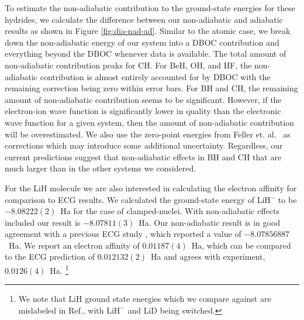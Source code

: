 \documentclass[pra,superscriptaddress,groupedaddress,twocolumn]{revtex4-1}
\begin{document}
To estimate the non-adiabatic contribution to the ground-state energies for these hydrides, we calculate the difference between our non-adiabatic and adiabatic results as shown in Figure \ref{fig:dia-nad-ad}. Similar to the atomic case, we break down the non-adiabatic energy of our system into a DBOC contribution and everything beyond the DBOC whenever data is available. The total amount of non-adiabatic contribution peaks for CH. For BeH, OH, and HF, the non-adiabatic contribution is almost entirely accounted for by DBOC with the remaining correction being zero within error bars. For BH and CH, the remaining amount of non-adiabatic contribution seems to be significant. However, if the electron-ion wave function is significantly lower in quality than the electronic wave function for a given system, then the amount of non-adiabatic contribution will be overestimated. 
We also use the zero-point energies from Feller et. al.~\cite{Feller_Corrections} 
as corrections which may introduce some additional uncertainty.  Regardless, our current predictions suggest that non-adiabatic effects in BH and CH that are much larger than in the other systems we considered.

For the LiH molecule we are also interested in calculating the electron affinity for comparison to ECG results. We calculated the ground-state energy of LiH$^-$ to be $-8.08222(2)$~Ha for the case of clamped-nuclei. With non-adiabatic effects included our result is  $-8.07811(3)$~Ha. Our non-adiabatic result is in good agreement with a previous ECG study \cite{Bubin_LiH_noBO}, which reported a value of $-8.07856887$~Ha. We report an electron affinity of $0.01187(4)$~Ha, which can be compared to the ECG prediction of $0.012132(2)$~Ha and agrees with experiment, $0.0126(4)$~Ha. \footnote{We note that LiH ground state energies which we compare against are mislabeled in Ref.\cite{Bubin_LiH_noBO}, with $\text{LiH}^-$ and LiD being switched.}
\end{document}
